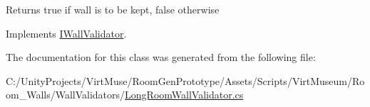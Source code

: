 \begin{DoxyReturn}{Returns}
true if wall is to be kept, false otherwise
\end{DoxyReturn}


Implements \mbox{\hyperlink{interface_i_wall_validator_a1618acf45bf2614985aeb8b240bf7da8}{I\+Wall\+Validator}}.



The documentation for this class was generated from the following file\+:\begin{DoxyCompactItemize}
\item 
C\+:/\+Unity\+Projects/\+Virt\+Muse/\+Room\+Gen\+Prototype/\+Assets/\+Scripts/\+Virt\+Museum/\+Room\+\_\+\+Walls/\+Wall\+Validators/\mbox{\hyperlink{_long_room_wall_validator_8cs}{Long\+Room\+Wall\+Validator.\+cs}}\end{DoxyCompactItemize}
